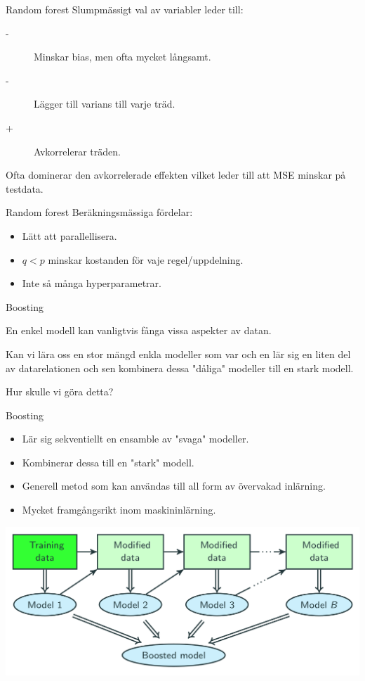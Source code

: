 \documentclass[10pt,english]{beamer}
\begin{document}
\begin{frame}{Random forest}
    Slumpmässigt val av variabler leder till:
    \begin{description}
        \item[-] Minskar bias, men ofta mycket långsamt.
        \item[-] Lägger till varians till varje träd.
        \item[+] Avkorrelerar träden.
    \end{description}
    Ofta dominerar den avkorrelerade effekten vilket leder till att MSE minskar på testdata.
\end{frame}

\begin{frame}{Random forest}
    Beräkningsmässiga fördelar:
    \begin{itemize}
        \item Lätt att parallellisera.
        \item $q <  p$ minskar kostanden för vaje regel/uppdelning.
        \item Inte så många hyperparametrar.
    \end{itemize}
\end{frame}

\begin{frame}{Boosting}
    
    En enkel modell kan vanligtvis fånga vissa aspekter av datan.

    Kan vi lära oss en stor mängd enkla modeller som var och en lär sig en liten del av datarelationen och sen kombinera dessa "dåliga" modeller till en stark modell.

    Hur skulle vi göra detta?

\end{frame}

\begin{frame}{Boosting}
    \begin{itemize}
        \item Lär sig sekventiellt en ensamble av "svaga" modeller.
        \item Kombinerar dessa till en "stark" modell.
        \item Generell metod som kan användas till all form av övervakad inlärning.
        \item Mycket framgångsrikt inom maskininlärning.
    \end{itemize}

    \includegraphics[width=\textwidth]{figs/boosting_scheme.png}
\end{frame}
\end{document}
